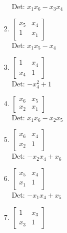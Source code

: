 \documentclass[12pt]{article}
\begin{document}
\begin{enumerate}
\begin{enumerate}
\begin{enumerate}
Det: $x_{1} x_{6} - x_{3} x_{4}$\\


\item $\displaystyle \left[\begin{matrix}x_{5} & x_{4}\\1 & x_{1}\end{matrix}\right]$\\

Det: $x_{1} x_{5} - x_{4}$\\


\item $\displaystyle \left[\begin{matrix}1 & x_{4}\\x_{4} & 1\end{matrix}\right]$\\

Det: $- x_{4}^{2} + 1$\\


\item $\displaystyle \left[\begin{matrix}x_{6} & x_{5}\\x_{2} & x_{1}\end{matrix}\right]$\\

Det: $x_{1} x_{6} - x_{2} x_{5}$\\


\item $\displaystyle \left[\begin{matrix}x_{6} & x_{4}\\x_{2} & 1\end{matrix}\right]$\\

Det: $- x_{2} x_{4} + x_{6}$\\


\item $\displaystyle \left[\begin{matrix}x_{5} & x_{4}\\x_{1} & 1\end{matrix}\right]$\\

Det: $- x_{1} x_{4} + x_{5}$\\


\item $\displaystyle \left[\begin{matrix}1 & x_{3}\\x_{3} & 1\end{matrix}\right]$\\


\end{enumerate}
\end{enumerate}
\end{enumerate}
\end{document}
